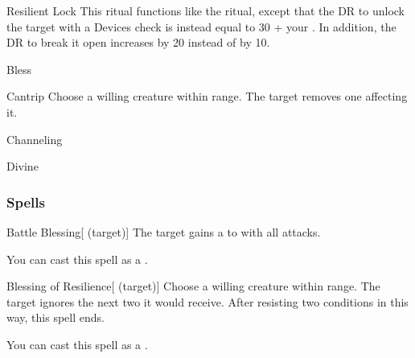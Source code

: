 \lowercase{\hypertarget{spell:Resilient Lock}{}}\label{spell:Resilient Lock}
\begin{ability}[\nth{4}]{\hypertarget{spell:Resilient Lock}{Resilient Lock}}
This ritual functions like the  ritual, except that the DR to unlock the target with a Devices check is instead equal to 30 + your .
In addition, the DR to break it open increases by 20 instead of by 10.
\end{ability}
\vspace{0.25em}


\newpage
\begin{spellsection}{Bless}

\begin{spellheader}
\end{spellheader}


\begin{ability}{Cantrip}
Choose a willing creature within \rngclose range.
The target removes one  affecting it.
\end{ability}




 Channeling

 Divine
\end{spellsection}


\subsubsection{Spells}


\lowercase{\hypertarget{spell:Battle Blessing}{}}\label{spell:Battle Blessing}
\begin{ability}[\nth{1}]{\hypertarget{spell:Battle Blessing}{Battle Blessing}}[ (target)]
The target gains a   to  with all attacks.

You can cast this spell as a .
\end{ability}
\vspace{0.25em}



\lowercase{\hypertarget{spell:Blessing of Resilience}{}}\label{spell:Blessing of Resilience}
\begin{ability}[\nth{1}]{\hypertarget{spell:Blessing of Resilience}{Blessing of Resilience}}[ (target)]
Choose a willing creature within \rngclose range.
The target ignores the next two  it would receive.
After resisting two conditions in this way, this spell ends.

You can cast this spell as a .
\end{ability}
\vspace{0.25em}



